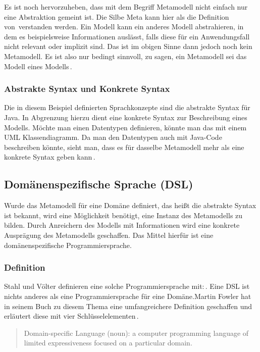 \documentclass[12pt,oneside,a4paper,parskip]{scrbook}
\begin{document}
Es ist noch hervorzuheben, dass mit dem Begriff Metamodell nicht einfach nur eine Abstraktion gemeint ist. Die Silbe Meta kann hier als \glqq die Definition von\grqq\ verstanden werden. Ein Modell kann ein anderes Modell abstrahieren, in dem es beispielsweise Informationen auslässt, falls diese für ein Anwendungsfall nicht relevant oder implizit sind. Das ist im obigen Sinne dann jedoch noch kein Metamodell. Es ist also nur bedingt sinnvoll, zu sagen, ein Metamodell sei das Modell eines Modells\,\cite[S. 27]{voelter2013}.

\subsubsection{Abstrakte Syntax und Konkrete Syntax}

Die in diesem Beispiel definierten Sprachkonzepte sind die abstrakte Syntax für Java. In Abgrenzung hierzu dient eine konkrete Syntax zur Beschreibung eines Modells. Möchte man einen Datentypen definieren, könnte man das mit einem UML Klassendiagramm. Da man den Datentypen auch mit Java-Code beschreiben könnte, sieht man, dass es für dasselbe Metamodell mehr als eine konkrete Syntax geben kann\,\cite[S. 59f.]{stahl2007}.

\subsection{Domänenspezifische Sprache (DSL)}

Wurde das Metamodell für eine Domäne definiert, das heißt die abstrakte Syntax ist bekannt, wird eine Möglichkeit benötigt, eine Instanz des Metamodells zu bilden. Durch Anreichern des Modells mit Informationen wird eine konkrete Ausprägung des Metamodells geschaffen. Das Mittel hierfür ist eine domänenspezifische Programmiersprache.

\subsubsection{Definition}

Stahl und Völter definieren eine solche Programmiersprache mit:\,\cite[S. 30]{stahl2007}. \glqq Eine DSL ist nichts anderes als eine Programmiersprache für eine Domäne.\grqq Martin Fowler hat in seinem Buch zu diesem Thema eine umfangreichere Definition geschaffen und erläutert diese mit vier Schlüsselelementen\,\cite[S. 27f.]{fowler2010}.

\begin{quote}\glqq Domain-specific Language (noun): a computer programming language of limited expressiveness focused on a particular domain.\grqq \end{quote}
\end{document}
